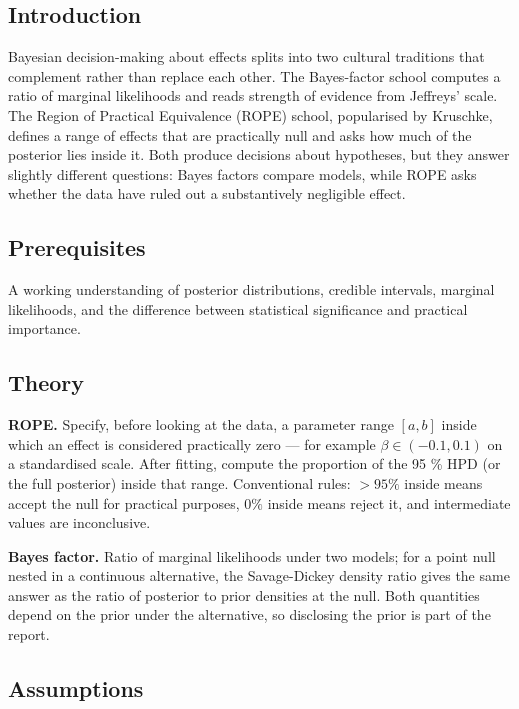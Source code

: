 \documentclass[
]{article}
\author{}
\date{\vspace{-2.5em}}
\begin{document}
\subsection{Introduction}\label{introduction}

Bayesian decision-making about effects splits into two cultural
traditions that complement rather than replace each other. The
Bayes-factor school computes a ratio of marginal likelihoods and reads
strength of evidence from Jeffreys' scale. The Region of Practical
Equivalence (ROPE) school, popularised by Kruschke, defines a range of
effects that are practically null and asks how much of the posterior
lies inside it. Both produce decisions about hypotheses, but they answer
slightly different questions: Bayes factors compare models, while ROPE
asks whether the data have ruled out a substantively negligible effect.

\subsection{Prerequisites}\label{prerequisites}

A working understanding of posterior distributions, credible intervals,
marginal likelihoods, and the difference between statistical
significance and practical importance.

\subsection{Theory}\label{theory}

\textbf{ROPE.} Specify, before looking at the data, a parameter range
\([a, b]\) inside which an effect is considered practically zero --- for
example \(\beta \in (-0.1, 0.1)\) on a standardised scale. After
fitting, compute the proportion of the 95 \% HPD (or the full posterior)
inside that range. Conventional rules: \(> 95 \%\) inside means accept
the null for practical purposes, \(0 \%\) inside means reject it, and
intermediate values are inconclusive.

\textbf{Bayes factor.} Ratio of marginal likelihoods under two models;
for a point null nested in a continuous alternative, the Savage-Dickey
density ratio gives the same answer as the ratio of posterior to prior
densities at the null. Both quantities depend on the prior under the
alternative, so disclosing the prior is part of the report.

\subsection{Assumptions}\label{assumptions}
\end{document}
